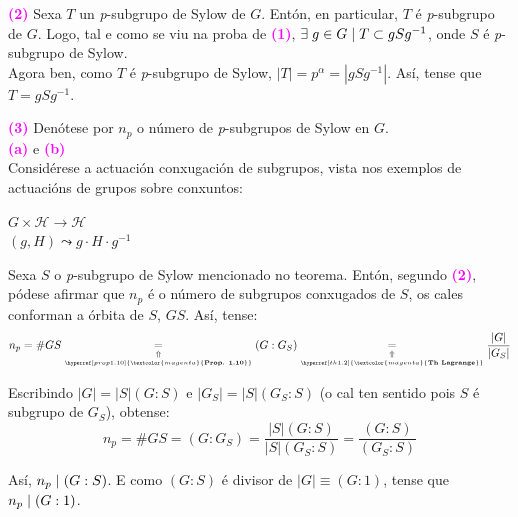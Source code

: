 \documentclass[twoside]{report}
\newcommand{\magbf}[1]{\textcolor{magenta}{\textbf{#1}}} %
\theoremstyle{mystyle}
\begin{document}
\vspace{5mm}

\noindent \magbf{(2)} Sexa $T$ un \textit{p}-subgrupo de Sylow de $G$. Entón, en particular, $T$ é \textit{p}-subgrupo de $G$. Logo, tal e como se viu na proba de \magbf{(1)}, $\exists \hspace{1mm} g \in G \hspace{1mm} | \hspace{1mm} T \subset gSg^{-1}$, onde $S$ é \textit{p}-subgrupo de Sylow.\\

\noindent Agora ben, como $T$ é \textit{p}-subgrupo de Sylow, $|T| = p^{\alpha} = |gSg^{-1}|$. Así, tense que $T = gSg^{-1}$.\\

\vspace{5mm}

\noindent \magbf{(3)} Denótese por $n_{p}$ o número de \textit{p}-subgrupos de Sylow en $G$.\\

\noindent \magbf{(a)} e \magbf{(b)}\\

\noindent Considérese a actuación conxugación de subgrupos, vista nos exemplos de actuacións de grupos sobre conxuntos:

    \begin{center}
    $G \times \mathscr{H} \longrightarrow \mathscr{H}$ \\
    \vspace{2mm}
    \hspace{8mm} $(g,H) \leadsto g \cdot H \cdot g^{-1}$
    \end{center}  
    
\noindent Sexa $S$ o \textit{p}-subgrupo de Sylow mencionado no teorema. Entón, segundo \magbf{(2)}, pódese afirmar que $n_{p}$ é o número de subgrupos conxugados de $S$, os cales conforman a órbita de $S$, $GS$. Así, tense:
$$n_{p} = \#GS \underset{\underset{\hyperref[prop1.10]{\magbf{Prop. 1.10}}}{\Uparrow}}{=} (G:G_{S}) \underset{\underset{\hyperref[th1.2]{\magbf{Th Lagrange}}}{\Uparrow}}{=} \displaystyle \frac{|G|}{|G_{S}|}$$

\noindent Escribindo $|G| = |S|(G:S)$ e $|G_{S}| = |S|(G_{S}:S)$ (o cal ten sentido pois $S$ é subgrupo de $G_{S}$), obtense:
$$n_{p} = \#GS = (G:G_{S}) = \displaystyle \frac{|S|(G:S)}{|S|(G_{S}:S)} = \displaystyle \frac{(G:S)}{(G_{S}:S)}$$

\noindent Así, $n_{p} \hspace{1mm} | \hspace{1mm} (G:S)$. E como $(G:S)$ é divisor de $|G| \equiv (G:1)$, tense que $n_{p} \hspace{1mm} | \hspace{1mm} (G:1)$.\\
\end{document}

